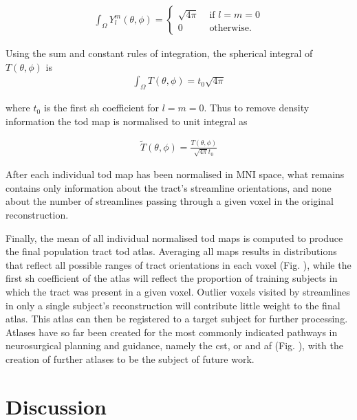 \begin{align}
  \int_{\Omega} Y^m_l(\theta, \phi) = \begin{cases}
   \sqrt{4\pi} & \text{ if } l=m=0\\
   0 & \text{ otherwise. }
  \end{cases}
\end{align}

Using the sum and constant rules of integration, the spherical integral of $T(\theta,\phi)$ is
\begin{align}
  \int_{\Omega} T(\theta,\phi) = t_0 \sqrt{4\pi}
\end{align}

where $t_0$ is the first \gls{sh} coefficient for $l=m=0$. Thus to remove density information the \gls{tod} map is normalised to unit integral as

\begin{align}
  \widetilde{T}(\theta, \phi) = \frac{T(\theta,\phi)}{\sqrt{4\pi} t_0}
\end{align}

After each individual \gls{tod} map has been normalised in MNI space, what remains contains only information about the tract's streamline orientations, and none about the number of streamlines passing through a given voxel in the original reconstruction.

Finally, the mean of all individual normalised \gls{tod} maps is computed to produce the final population tract \gls{tod} atlas.
Averaging all maps results in distributions that reflect all possible ranges of tract orientations in each voxel (Fig. ), while the first \gls{sh} coefficient of the atlas will reflect the proportion of training subjects in which the tract was present in a given voxel.
Outlier voxels visited by streamlines in only a single subject's reconstruction will contribute little weight to the final atlas.
This atlas can then be registered to a target subject for further processing.
Atlases have so far been created for the most commonly indicated pathways in neurosurgical planning and guidance, namely the \gls{cst}, \gls{or} and \gls{af} (Fig. ), with the creation of further atlases to be the subject of future work.

\section{Discussion}

